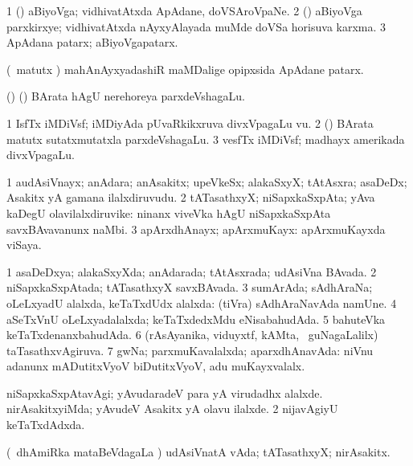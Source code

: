 \bentry
{}
\gl{\nA}
\bmng
\bnum
\num{1} (\nAyxshA) aBiyoVga; vidhivatAtxda ApAdane, doVSAroVpaNe. 
\num{2} (\nAyxshA) aBiyoVga parxkirxye; vidhivatAtxda nAyxyAlayada muMde doVSa horisuva karxma. 
\num{3} ApAdana patarx; aBiyoVgapatarx. 
\enum
\emng

\noindent
\gl{\pagu}
\bmng
{} (\ca\ matutx \ame) mahAnAyxyadashiR maMDalige opipxsida ApAdane patarx. 
\emng
\eentry

\bentry
{}
\gl{\nA}
\bmng
(\bava) (\pArxparx) BArata hAgU nerehoreya parxdeVshagaLu. 
\emng

\noindent
\gl{\pagu}
\bmng
\bnum
\num{1}  IsfTx iMDiVsf; iMDiyAda pUvaRkikxruva divxVpagaLu \mo vu. 
\num{2}  (\pArxparx) BArata matutx sutatxmutatxla parxdeVshagaLu. 
\num{3}  vesfTx iMDiVsf; madhayx amerikada divxVpagaLu. 
\enum
\emng
\eentry

\bentry
{}
\gl{\nA}
\bmng
\bnum
\num{1} audAsiVnayx; anAdara; anAsakitx; upeVkeSx; alakaSxyX; tAtAsxra; asaDeDx; Asakitx yA gamana ilalxdiruvudu. 
\num{2} tATasathxyX; niSapxkaSxpAta; yAva kaDegU olavilalxdiruvike:  ninanx viveVka hAgU niSapxkaSxpAta savxBAvavanunx naMbi. 
\num{3} apArxdhAnayx; apArxmuKayx:  apArxmuKayxda viSaya. 
\enum
\emng
\eentry

\bentry
{}
\gl{\gu}
\bmng
\bnum
\num{1} asaDeDxya; alakaSxyXda; anAdarada; tAtAsxrada; udAsiVna BAvada. 
\num{2} niSapxkaSxpAtada; tATasathxyX savxBAvada. 
\num{3} sumArAda; sAdhAraNa; oLeLxyadU alalxda, keTaTxdUdx alalxda:  (tiVra) sAdhAraNavAda namUne. 
\num{4} aSeTxVnU oLeLxyadalalxda; keTaTxdedxMdu eNisabahudAda. 
\num{5} bahuteVka keTaTxdenanxbahudAda. 
\num{6} (rAsAyanika, viduyxtf, kAMta, \mo\ guNagaLalilx) taTasathxvAgiruva. 
\num{7} gwNa; parxmuKavalalxda; aparxdhAnavAda:  niVnu adanunx mADutitxVyoV biDutitxVyoV, adu muKayxvalalx. 
\enum
\emng

\noindent
\gl{\pagu}
\bmng
\bnum
{}  
\banum
{} niSapxkaSxpAtavAgi; yAvudaradeV para yA virudadhx alalxde. 
 nirAsakitxyiMda; yAvudeV Asakitx yA olavu ilalxde. 
\eanum
\numie
\num{2}  nijavAgiyU keTaTxdAdxda. 
\enum
\emng
\eentry

\bentry
{}
\gl{\nA}
\bmng
(\kanmu\ dhAmiRka mataBeVdagaLa \vi) udAsiVnatA vAda; tATasathxyX; nirAsakitx. 
\emng
\eentry


